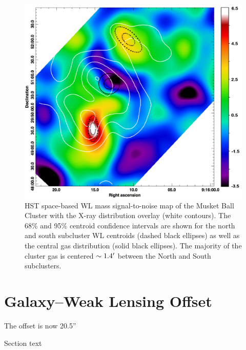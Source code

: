 \begin{figure}
\centering
\includegraphics[width=5in]{Chapter4/LensingXrayOverlay.png}
\caption[Musket Ball Cluster weak lensing signal-to-noise map with X-ray map overlay, including centroid locations.]{
HST space-based WL mass signal-to-noise map of the Musket Ball Cluster with the X-ray distribution overlay (white contours).
The 68\% and 95\% centroid confidence intervals are shown for the north and south subcluster WL centroids (dashed black ellipses) as well as the central gas distribution (solid black ellipses).
The majority of the cluster gas is centered $\sim1.4\mbox{$^\prime$}$ between the North and South subclusters.
}
\label{figure:LensingXrayOverlay}
\end{figure}


\section{Galaxy--Weak Lensing Offset}

The offset is now 20.5''

Section text

